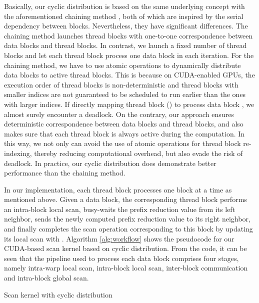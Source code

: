 \documentclass[article]{elsarticle}
\begin{document}
{Basically, our cyclic distribution is based on the same underlying concept with the aforementioned chaining method \cite{yan2013streamscan}, both of which are inspired by the serial dependency between blocks. Nevertheless, they have significant differences. The chaining method launches  thread blocks with one-to-one correspondence between data blocks and thread blocks. In contrast, we launch a fixed number of thread blocks and let each thread block process one data block in each iteration. For the chaining method, we have to use atomic operations to dynamically distribute data blocks to active thread blocks. This is because on CUDA-enabled GPUs, the execution order of thread blocks is non-deterministic and thread blocks with smaller indices are not guaranteed to be scheduled to run earlier than the ones with larger indices. If directly mapping thread block  (\mbox{}) to process data block , we almost surely encounter a deadlock. On the contrary, our approach ensures deterministic correspondence between data blocks and thread blocks, and also makes sure that each thread block is always active during the computation. In this way, we not only can avoid the use of atomic operations for thread block re-indexing, thereby reducing computational overhead, but also evade the risk of deadlock. In practice, our cyclic distribution does demonstrate better performance than the chaining method.

In our implementation, each thread block processes one block at a time as mentioned above. Given a data block, the corresponding thread block performs an intra-block local scan, busy-waits the prefix reduction value  from its left neighbor, sends the newly computed prefix reduction value  to its right neighbor, and finally completes the scan operation corresponding to this block by updating its local scan with . Algorithm \ref{alg:workflow} shows the pseudocode for our CUDA-based scan kernel based on cyclic distribution. From the code, it can be seen that the pipeline used to process each data block comprises four stages, namely intra-warp local scan, intra-block local scan, inter-block communication and intra-block global scan.
\begin{algorithm}[!h]
\caption{Scan kernel with cyclic distribution}
\label{alg:workflow}
\begin{algorithmic}[1]
\fontsize{8pt}{8.05pt}\selectfont
{}
    \For{ = ; ;  += }
    
        

\end{algorithmic}
\end{algorithm}}
\end{document}
